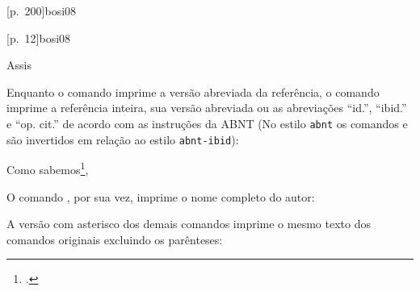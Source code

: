 \documentclass[a4paper]{article}
\begin{document}
\begin{example}
\citeauthor{bosi08}
\end{example}

\begin{example}
\citeyear{bosi08}
\end{example}

\begin{example}
\cites{mann09}{moretti09:1, moretti09}
\end{example}

\begin{example}
[p.~200]{bosi08}
\end{example}

\begin{example}
[p.~12]{bosi08}
\end{example}

\begin{example}
\end{example}

\begin{example}
Assis \cite[apud][p.~200]{bosi08}
\end{example}


Enquanto o comando \PVerb{\footcite} imprime a versão abreviada da referência, o comando \PVerb{\footcite*} imprime a referência inteira, sua versão
abreviada ou as abreviações ``id.'', ``ibid.'' e ``op. cit.'' de acordo com
as instruções da ABNT (No estilo \texttt{abnt} os comandos \PVerb{\footcite} e \PVerb{\footcite*} são invertidos em relação ao estilo \texttt{abnt-ibid}):

\begin{example}
Como sabemos\footcite*[Cf.][]{bosi08},
\end{example}

O comando \PVerb{\textcite*}, por sua vez, imprime o nome completo do autor:

\begin{example}
\textcite*{bosi08}
\end{example}

A versão com asterisco dos demais comandos imprime o mesmo texto dos comandos
originais excluindo os parênteses:

\begin{example}
\cite*{bosi08}
\end{example}

\begin{example}
\end{example}
\end{document}

